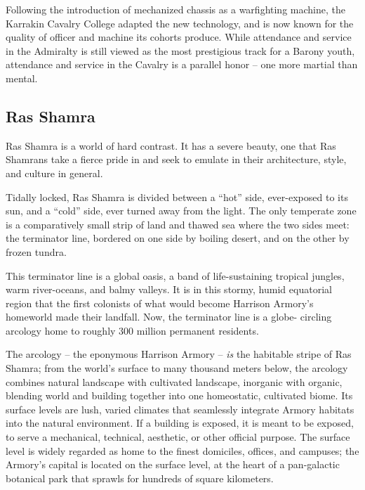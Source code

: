 Following the introduction of mechanized chassis as a warfighting machine, the Karrakin Cavalry
College adapted the new technology, and is now known for the quality of officer and machine its
cohorts produce. While attendance and service in the Admiralty is still viewed as the most
prestigious track for a Barony youth, attendance and service in the Cavalry is a parallel honor --
one more martial than mental.

\subsection{Ras Shamra}

Ras Shamra is a world of hard contrast. It has a severe beauty, one that Ras Shamrans take a
fierce pride in and seek to emulate in their architecture, style, and culture in general.

Tidally locked, Ras Shamra is divided between a ``hot'' side, ever-exposed to its sun, and a ``cold''
side, ever turned away from the light. The only temperate zone is a comparatively small strip of
land and thawed sea where the two sides meet: the terminator line, bordered on one side by
boiling desert, and on the other by frozen tundra.

This terminator line is a global oasis, a band of life-sustaining tropical jungles, warm river-oceans,
and balmy valleys. It is in this stormy, humid equatorial region that the first colonists of what would
become Harrison Armory's homeworld made their landfall. Now, the terminator line is a globe-
circling arcology home to roughly 300 million permanent residents.

The arcology -- the eponymous Harrison Armory -- \textit{is} the habitable stripe of Ras Shamra; from the
world's surface to many thousand meters below, the arcology combines natural landscape with
cultivated landscape, inorganic with organic, blending world and building together into one
homeostatic, cultivated biome. Its surface levels are lush, varied climates that seamlessly
integrate Armory habitats into the natural environment. If a building is exposed, it is meant to be
exposed, to serve a mechanical, technical, aesthetic, or other official purpose. The surface level is
widely regarded as home to the finest domiciles, offices, and campuses; the Armory's capital is
located on the surface level, at the heart of a pan-galactic botanical park that sprawls for
hundreds of square kilometers.


